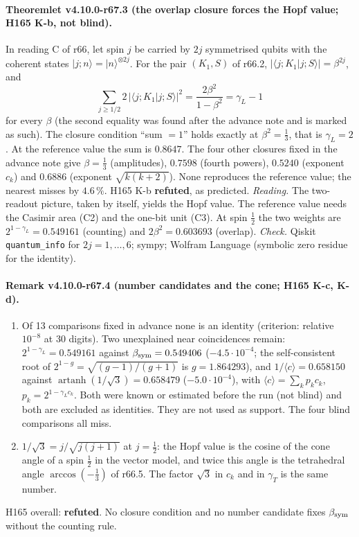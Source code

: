 \paragraph{Theoremlet v4.10.0-r67.3 (the overlap closure forces the Hopf value; H165 K-b, not blind).}
In reading C of r66, let spin \(j\) be carried by \(2j\) symmetrised qubits with the coherent states \(|j;n\rangle=|n\rangle^{\otimes2j}\).  For the
pair \((K_1,S)\) of r66.2, \(|\langle j;K_1|j;S\rangle|=\beta^{2j}\), and
\[
\sum_{j\ge1/2}2\,|\langle j;K_1|j;S\rangle|^2=\frac{2\beta^2}{1-\beta^2}=\gamma_L-1
\]
for every \(\beta\) (the second equality was found after the advance note and is marked as such).  The closure condition ``sum \(=1\)'' holds exactly
at \(\beta^2=\tfrac13\), that is \(\gamma_L=2\).  At the reference value the sum is \(0.8647\).  The four other closures fixed in the advance note
give \(\beta=\tfrac13\) (amplitudes), \(0.7598\) (fourth powers), \(0.5240\) (exponent \(c_k\)) and \(0.6886\) (exponent \(\sqrt{k(k+2)}\)).  None
reproduces the reference value; the nearest misses by \(4.6\,\%\).  H165 K-b \textbf{refuted}, as predicted.
\emph{Reading.}  The two-readout picture, taken by itself, yields the Hopf value.  The reference value needs the Casimir area (C2) and the
one-bit unit (C3).  At spin \(\tfrac12\) the two weights are \(2^{1-\gamma_L}=0.549161\) (counting) and \(2\beta^2=0.603693\) (overlap).
\emph{Check.} Qiskit \texttt{quantum\_info} for \(2j=1,\dots,6\); sympy; Wolfram Language (symbolic zero residue for the identity).

\paragraph{Remark v4.10.0-r67.4 (number candidates and the cone; H165 K-c, K-d).}
\begin{enumerate}[leftmargin=2em]
\item[(a)] Of 13 comparisons fixed in advance none is an identity (criterion: relative \(10^{-8}\) at 30 digits).  Two unexplained near
coincidences remain: \(2^{1-\gamma_L}=0.549161\) against \(\beta_{\rm sym}=0.549406\) (\(-4.5\cdot10^{-4}\); the self-consistent root of
\(2^{1-g}=\sqrt{(g-1)/(g+1)}\) is \(g=1.864293\)), and \(1/\langle c\rangle=0.658150\) against \(\operatorname{artanh}(1/\sqrt3)=0.658479\)
(\(-5.0\cdot10^{-4}\)), with \(\langle c\rangle=\sum_kp_kc_k\), \(p_k=2^{1-\gamma_Lc_k}\).  Both were known or estimated before the run (not blind) and
both are excluded as identities.  They are not used as support.  The four blind comparisons all miss.
\item[(b)] \(1/\sqrt3=j/\sqrt{j(j+1)}\) at \(j=\tfrac12\): the Hopf value is the cosine of the cone angle of a spin \(\tfrac12\) in the vector model, and
twice this angle is the tetrahedral angle \(\arccos(-\tfrac13)\) of r66.5.  The factor \(\sqrt3\) in \(c_k\) and in \(\gamma_T\) is the same number.
\end{enumerate}
H165 overall: \textbf{refuted}.  No closure condition and no number candidate fixes \(\beta_{\rm sym}\) without the counting rule.

